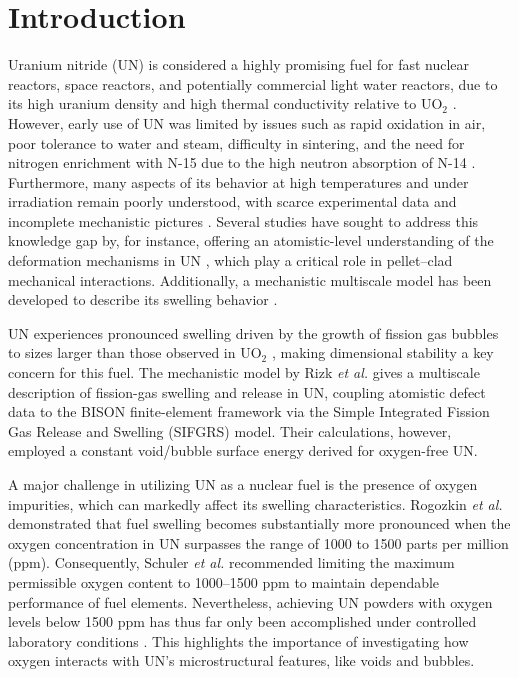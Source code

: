 \documentclass[preprint,12pt,sort&compress]{elsarticle}
\newcommand{\?}{\stackrel{?}{=}}
\begin{document}
\newpage

\linenumbers

\section{Introduction}
\label{intro}

Uranium nitride (UN) is considered a highly promising fuel for fast nuclear reactors, space reactors, and potentially commercial light water reactors, due to its high uranium density and high thermal conductivity relative to UO$_2$ \cite{Wallenius2020, Uno2020}. However, early use of UN was limited by issues such as rapid oxidation in air, poor tolerance to water and steam, difficulty in sintering, and the need for nitrogen enrichment with N-15 due to the high neutron absorption of N-14 \cite{Wallenius2020, Uno2020}. Furthermore, many aspects of its behavior at high temperatures and under irradiation remain poorly understood, with scarce experimental data and incomplete mechanistic pictures \cite{Wallenius2020, Uno2020}. Several studies have sought to address this knowledge gap by, for instance, offering an atomistic-level understanding of the deformation mechanisms in UN \cite{AbdulHameed2024b, AbdulHameed2025}, which play a critical role in pellet–clad mechanical interactions. Additionally, a mechanistic multiscale model has been developed to describe its swelling behavior \cite{Rizk2025}.

UN experiences pronounced swelling driven by the growth of fission gas bubbles to sizes larger than those observed in UO$_2$ \cite{Ronchi1975, Ronchi1978, Rizk2025}, making dimensional stability a key concern for this fuel. The mechanistic model by Rizk \textit{et al.} \cite{Rizk2025} gives a multiscale description of fission-gas swelling and release in UN, coupling atomistic defect data to the BISON finite-element framework via the Simple Integrated Fission Gas Release and Swelling (SIFGRS) model. Their calculations, however, employed a constant void/bubble surface energy derived for oxygen-free UN.

A major challenge in utilizing UN as a nuclear fuel is the presence of oxygen impurities, which can markedly affect its swelling characteristics. Rogozkin \textit{et al.} \cite{Rogozkin2003} demonstrated that fuel swelling becomes substantially more pronounced when the oxygen concentration in UN surpasses the range of 1000 to 1500 parts per million (ppm). Consequently, Schuler \textit{et al.} \cite{Schuler2017} recommended limiting the maximum permissible oxygen content to 1000--1500 ppm to maintain dependable performance of fuel elements. Nevertheless, achieving UN powders with oxygen levels below 1500 ppm has thus far only been accomplished under controlled laboratory conditions \cite{Schuler2017}. This highlights the importance of investigating how oxygen interacts with UN's microstructural features, like voids and bubbles. 
\end{document}
